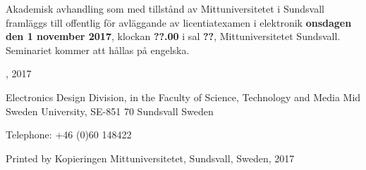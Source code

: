 \thispagestyle{empty}

{\raggedright
Akademisk avhandling som med tillstånd av Mittuniversitetet i Sundsvall framläggs till offentlig för avläggande av licentiatexamen i elektronik \textbf{onsdagen den 1 november 2017}, klockan \textbf{??.00} i sal \textbf{??}, Mittuniversitetet Sundsvall. Seminariet kommer att hållas på engelska.

\vfill

{\large\thetitle}

\vspace{1cm}

\theauthor

\vspace{1cm}

\textcopyright \theauthor, 2017
\vspace{1cm}

Electronics Design Division, in the
Faculty of Science, Technology and Media
Mid Sweden University, SE-851 70 Sundsvall
Sweden

\vspace{1cm}

Telephone: +46 (0)60 148422

\vspace{1cm}

Printed by Kopieringen Mittuniversitetet, Sundsvall, Sweden, 2017
}